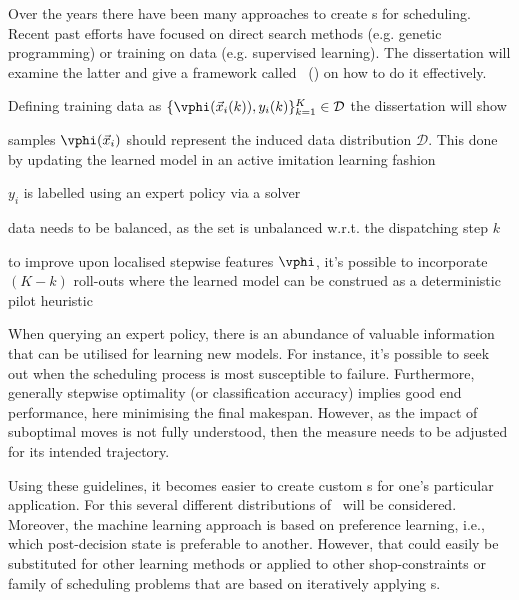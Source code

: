 
Over the years there have been many approaches to create \dr s for scheduling.
Recent past efforts have focused on direct search methods (e.g. genetic 
programming) or training on data (e.g. supervised learning).
The dissertation will examine the latter and give a framework called 
\fullnameAlice\ (\Alice) on how to do it effectively. 

Defining training data as 
\mbox{$\{\vphi(\vec{x}_i(k)),y_i(k)\}_{k=1}^K\in\mathcal{D}$} the dissertation 
will show
\begin{enumerate*}
    \item samples $\vphi(\vec{x}_i)$ should represent the induced data 
    distribution $\mathcal{D}$. This done by updating the learned model in an 
    active imitation learning fashion
    \item $y_i$ is labelled using an expert policy via a solver
    \item data needs to be balanced, as the set is unbalanced w.r.t. the
    dispatching step $k$
    \item to improve upon localised stepwise features $\vphi$, it's possible to 
    incorporate $(K-k)$ roll-outs where the learned model can be construed as a 
    deterministic pilot heuristic
\end{enumerate*}

When querying an expert policy, there is an abundance of valuable information 
that can be utilised for learning new models.
For instance, it's possible to seek out when the scheduling process is most 
susceptible to failure.
Furthermore, generally stepwise optimality (or classification accuracy) 
implies good end performance, here minimising the final makespan. 
However, as the impact of suboptimal moves is not fully understood, then the 
measure needs to be adjusted for its intended trajectory.

Using these guidelines, it becomes easier to create custom \dr s for one's 
particular application. For this several different distributions of \jsp\ 
will be considered.
Moreover, the machine learning approach is based on preference learning, i.e.,  
which post-decision state is preferable to another. 
However, that could easily be substituted for other learning methods or applied 
to other shop-constraints or family of scheduling problems that are based on 
iteratively applying \dr s.

